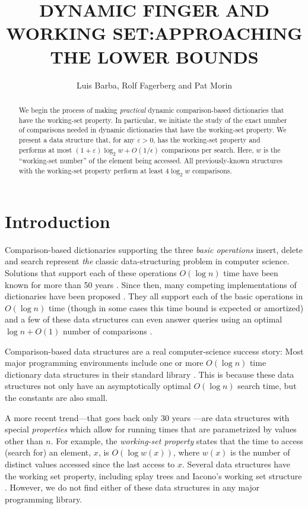 \documentclass[lotsofwhite]{patmorin}
\title{\MakeUppercase{Dynamic Finger and Working Set:\newline Approaching the Lower Bounds}}
\author{Luis Barba, Rolf Fagerberg and Pat Morin}
\newcommand{\eps}{\varepsilon}
\begin{document}
\begin{titlepage}
\maketitle

\begin{abstract}
  We begin the process of making \emph{practical} dynamic comparison-based
  dictionaries that have the working-set property.  In particular,
  we initiate the study of the exact number of comparisons needed in
  dynamic dictionaries that have the working-set property.  We present a
  data structure that, for any $\eps > 0$, has the working-set property
  and performs at most $(1+\eps)\log_2 w+O(1/\epsilon)$ comparisons per
  search.  Here, $w$ is the ``working-set number'' of the element being
  accessed.  All previously-known structures with the working-set property
  perform at least $4\log_2 w$ comparisons.
\end{abstract}

\end{titlepage}

\section{Introduction}

Comparison-based dictionaries supporting the three \emph{basic operations}
insert, delete and search represent \emph{the} classic data-structuring
problem in computer science.  Solutions that support each of these
operations $O(\log n)$ time have been known for more than 50 years
\cite{avl}.  Since then, many competing implementations of dictionaries
have been proposed \cite{X}.  They all support each of the basic
operations in $O(\log n)$ time (though in some cases this time bound is
expected or amortized) and a few of these data structures can even answer
queries using an optimal $\log n + O(1)$ number of comparisons \cite{X,Y}.

Comparison-based data structures are a real
computer-science success story: Most major programming environments
include one or more $O(\log n)$ time dictionary data structures in their
standard library \cite{S}.  This is because these data structures not
only have an asymptotically optimal $O(\log n)$ search time, but the
constants are also small.

A more recent trend---that goes back only 30 years \cite{X}---are data
structures with special \emph{properties} which allow for running
times that are parametrized by values other than $n$.  For example,
the \emph{working-set property} states that the time to access (search
for) an element, $x$, is $O(\log w(x))$, where $w(x)$ is the number
of distinct values accessed since the last access to $x$. Several data
structures have the working set property, including splay trees \cite{S}
and Iacono's working set structure \cite{S}.  However, we do not find
either of these data structures in any major programming library.
\end{document}
